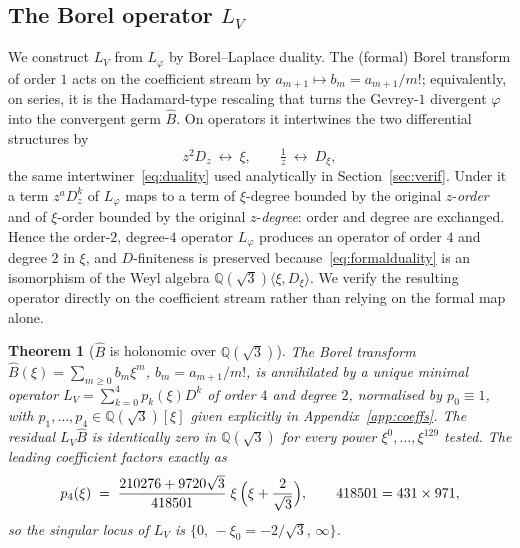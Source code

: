 \documentclass[11pt,reqno]{amsart}
\renewcommand{\_}{\vquadorigunderscore\allowbreak}
\theoremstyle{plain}
\newtheorem{theorem}{Theorem}[section]
\theoremstyle{definition}
\newcommand{\Bhat}{\widehat{B}}
\newcommand{\Lphi}{L_{\varphi}}
\newcommand{\LV}{L_{V}}
\newcommand{\Qsqrt}{\mathbb{Q}(\sqrt3)}
\newcommand{\xizero}{\xi_0}
\begin{document}
\subsection{The Borel operator \texorpdfstring{$\LV$}{LV}}
We construct $\LV$ from $\Lphi$ by Borel--Laplace duality. The (formal) Borel transform of order
$1$ acts on the coefficient stream by $a_{m+1}\mapsto b_m=a_{m+1}/m!$; equivalently, on series, it
is the Hadamard-type rescaling that turns the Gevrey-$1$ divergent $\varphi$ into the convergent
germ $\Bhat$. On operators it intertwines the two differential structures by
\begin{equation}\label{eq:formalduality}
  z^2 D_z\ \longleftrightarrow\ \xi,\qquad \tfrac1z\ \longleftrightarrow\ D_\xi,
\end{equation}
the same intertwiner~\eqref{eq:duality} used analytically in Section~\ref{sec:verif}. Under it a
term $z^{a}D_z^{k}$ of $\Lphi$ maps to a term of $\xi$-degree bounded by the original
$z$-\emph{order} and of $\xi$-order bounded by the original $z$-\emph{degree}: order and degree are
exchanged. Hence the order-$2$, degree-$4$ operator $\Lphi$ produces an operator of order $4$ and
degree $2$ in $\xi$, and $D$-finiteness is preserved because~\eqref{eq:formalduality} is an
isomorphism of the Weyl algebra $\Qsqrt\langle\xi,D_\xi\rangle$. We verify the resulting operator
directly on the coefficient stream rather than relying on the formal map alone.

\begin{theorem}[$\Bhat$ is holonomic over $\Qsqrt$]\label{thm:LV}
The Borel transform $\Bhat(\xi)=\sum_{m\ge0}b_m\xi^m$, $b_m=a_{m+1}/m!$, is annihilated by a
unique minimal operator $\LV=\sum_{k=0}^4 p_k(\xi)D^k$ of order $4$ and degree $2$, normalised by
$p_0\equiv1$, with $p_1,\dots,p_4\in\Qsqrt[\xi]$ given explicitly in
Appendix~\ref{app:coeffs}. The residual $\LV\Bhat$ is identically zero in $\Qsqrt$ for every power
$\xi^0,\dots,\xi^{129}$ tested. The leading coefficient factors exactly as
\begin{equation}\label{eq:p4-factor}
  p_4(\xi)\;=\;\frac{210276+9720\sqrt3}{418501}\;\xi\,\Bigl(\xi+\frac{2}{\sqrt3}\Bigr),
  \qquad 418501=431\times971,
\end{equation}
so the singular locus of $\LV$ is $\{0,\,-\xizero=-2/\sqrt3,\,\infty\}$.
\end{theorem}
\end{document}
